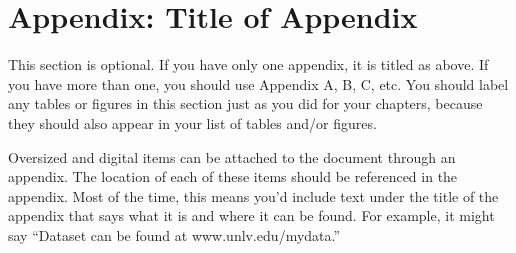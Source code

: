 \chapter*{Appendix: Title of Appendix}%

This section is optional. If you have only one appendix, it is titled as above. If you have more than one, you should use Appendix A, B, C, etc. You should label any tables or figures in this section just as you did for your chapters, because they should also appear in your list of tables and/or figures. 

Oversized and digital items can be attached to the document through an appendix. The location of each of these items should be referenced in the appendix. Most of the time, this means you'd include text under the title of the appendix that says what it is and where it can be found. For example, it might say ``Dataset can be found at www.unlv.edu/mydata.''

\blindtext


